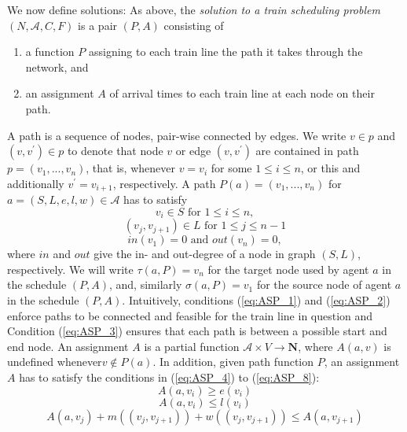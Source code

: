 \documentclass{article}
\begin{document}
We now define solutions:
As above, the \emph{solution to a train scheduling problem} $(N, \mathcal{A}, C, F)$ is a pair $(P,A)$ consisting of 
\begin{enumerate}
    \item a function $P$ assigning to each train line the path it takes through the network, and
    \item an assignment $A$ of arrival times to each train line at each node on their path.
\end{enumerate}
A path is a sequence of nodes, pair-wise connected by edges. We write $v\in p$ and $(v, v^\prime)\in p$ to denote that node $v$ or edge $(v, v^\prime)$ are contained in path $p=(v_1, . . . , v_n)$, that is, whenever $v=v_i$ for some $1\leq i \leq n$, or this and additionally $v^\prime=v_{i+1}$, respectively.
%
A path $P(a) = (v_1, . . . , v_n)$ for $a= (S, L, e, l, w)\in \mathcal{A}$ has to satisfy
\begin{equation}
v_i \in S \textrm{ for }1\leq i \leq n \label{eq:ASP_1},
\end{equation}
\begin{equation}
(v_j, v_{j+1})\in L \textrm{ for } 1\leq j \leq n-1 \label{eq:ASP_2} 
\end{equation}
\begin{equation}
in(v_1) = 0 \textrm{ and } out(v_n) = 0,\label{eq:ASP_3} 
\end{equation}
where $in$ and $out$ give the in- and out-degree of a node in graph $(S, L)$, respectively.
We will write $\tau(a,P)=v_n$ for the target node used by agent $a$ in the schedule $(P,A)$, and, similarly $\sigma(a,P)=v_1$ for the source node of agent $a$ in the schedule $(P,A)$.
Intuitively, conditions (\ref{eq:ASP_1}) and (\ref{eq:ASP_2}) enforce paths to be connected and feasible for the train line in question and Condition (\ref{eq:ASP_3}) ensures that each path is between a possible start and end node.  
An assignment $A$ is a partial function $\mathcal{A}\times V\to \mathbf{N}$, where $A(a, v)$ is undefined whenever$v\not\in P(a)$. In addition, given path function $P$, an assignment $A$ has to satisfy the conditions in (\ref{eq:ASP_4}) to (\ref{eq:ASP_8}):
\begin{equation}
A(a, v_i)\geq e(v_i)\label{eq:ASP_4}
\end{equation}
\begin{equation}
A(a, v_i)\leq l(v_i)\label{eq:ASP_5}
\end{equation}
\begin{equation}
A(a, v_j) +m((v_j, v_{j+1})) +w((v_j, v_{j+1}))\leq A(a, v_{j+1})\label{eq:ASP_6}
\end{equation}
\end{document}
